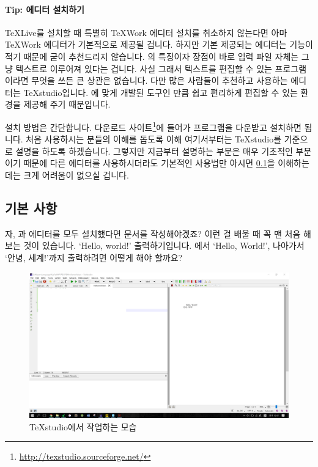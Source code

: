 \paragraph{Tip: 에디터 설치하기}
\TeX Live를 설치할 때 특별히 TeXWork 에디터 설치를 취소하지 않는다면 아마 TeXWork 에디터가 기본적으로 제공될 겁니다. 하지만 기본 제공되는 에디터는 기능이 적기 때문에 굳이 추천드리지 않습니다. \lt 의 특징이자 장점이 바로 입력 파일 자체는 그냥 텍스트로 이루어져 있다는 겁니다. 사실 그래서 텍스트를 편집할 수 있는 프로그램이라면 무엇을 쓰든 큰 상관은 없습니다. 다만 많은 사람들이 추천하고 사용하는 에디터는 TeXstudio입니다. \lt 에 맞게 개발된 도구인 만큼 쉽고 편리하게 편집할 수 있는 환경을 제공해 주기 때문입니다.

설치 방법은 간단합니다. 다운로드 사이트\footnote{\url{http://texstudio.sourceforge.net/}}에 들어가 프로그램을 다운받고 설치하면 됩니다. 처음 사용하시는 분들의 이해를 돕도록 이해 여기서부터는 TeXstudio를 기준으로 설명을 하도록 하겠습니다. 그렇지만 지금부터 설명하는 부분은 매우 기초적인 부분이기 때문에 다른 \lt 에디터를 사용하시더라도 기본적인 사용법만 아시면 \ref{sec:basics}을 이해하는 데는 크게 어려움이 없으실 겁니다.

\subsection{기본 사항}
\label{sec:basics}
자, \lt 과 에디터를 모두 설치했다면 문서를 작성해야겠죠? 이런 걸 배울 때 꼭 맨 처음 해보는 것이 있습니다. `Hello, world!' 출력하기입니다. \lt 에서 `Hello, World!', 나아가서 `안녕, 세계!'까지 출력하려면 어떻게 해야 할까요?

\begin{figure}[h]
	\includegraphics[width=\textwidth]{figures/nhelloworld.png}
	\caption{TeXstudio에서 작업하는 모습\label{fig:nhelloworld}}
\end{figure}

